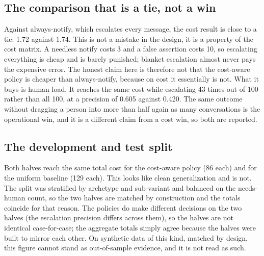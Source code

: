 \documentclass{article}
\begin{document}
\subsection{The comparison that is a tie, not a win}
Against always-notify, which escalates every message, the cost result is close to
a tie: 1.72 against 1.74. This is not a mistake in the design, it is a property of
the cost matrix. A needless notify costs 3 and a false assertion costs 10, so
escalating everything is cheap and is barely punished; blanket escalation almost
never pays the expensive error. The honest claim here is therefore not that the
cost-aware policy is cheaper than always-notify, because on cost it essentially is
not. What it buys is human load. It reaches the same cost while escalating 43
times out of 100 rather than all 100, at a precision of 0.605 against 0.420. The
same outcome without dragging a person into more than half again as many
conversations is the operational win, and it is a different claim from a cost win,
so both are reported.

\subsection{The development and test split}
Both halves reach the same total cost for the cost-aware policy (86 each) and for
the uniform baseline (129 each). This looks like clean generalization and is not.
The split was stratified by archetype and sub-variant and balanced on the
needs-human count, so the two halves are matched by construction and the totals
coincide for that reason. The policies do make different decisions on the two
halves (the escalation precision differs across them), so the halves are not
identical case-for-case; the aggregate totals simply agree because the halves were
built to mirror each other. On synthetic data of this kind, matched by design,
this figure cannot stand as out-of-sample evidence, and it is not read as such.
\end{document}
